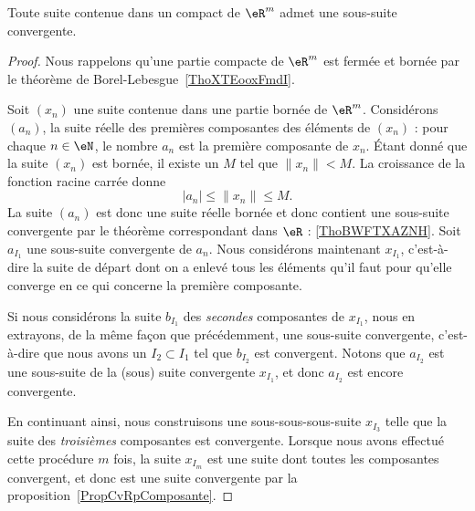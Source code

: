 \begin{theorem}        \label{ThoBolzanoWeierstrassRn}
	Toute suite contenue dans un compact de \( \eR^m\) admet une sous-suite convergente.
\end{theorem}

\begin{proof}
	Nous rappelons qu'une partie compacte de \( \eR^m\) est fermée et bornée par le théorème de Borel-Lebesgue~\ref{ThoXTEooxFmdI}.

	Soit \( (x_n)\) une suite contenue dans une partie bornée de \( \eR^m\). Considérons \( (a_n)\), la suite réelle des premières composantes des éléments de \( (x_n)\) : pour chaque \( n\in\eN\), le nombre \( a_n\) est la première composante de \( x_n\). Étant donné que la suite \( (x_n)\) est bornée, il existe un \( M\) tel que \( \| x_n \|<M\). La croissance de la fonction racine carrée donne
	\begin{equation}
		| a_n |\leq\| x_n \|\leq M.
	\end{equation}
	La suite \( (a_n)\) est donc une suite réelle bornée et donc contient une sous-suite convergente par le théorème correspondant dans \( \eR\) :  \ref{ThoBWFTXAZNH}. Soit \( a_{I_1}\) une sous-suite convergente de \( a_n\). Nous considérons maintenant \( x_{I_1}\), c'est-à-dire la suite de départ dont on a enlevé tous les éléments qu'il faut pour qu'elle converge en ce qui concerne la première composante.

	Si nous considérons la suite \( b_{I_1}\) des \emph{secondes} composantes de \( x_{I_1}\), nous en extrayons, de la même façon que précédemment, une sous-suite convergente, c'est-à-dire que nous avons un \( I_2\subset I_1\) tel que \( b_{I_2}\) est convergent. Notons que \( a_{I_2}\) est une sous-suite de la (sous) suite convergente \( x_{I_1}\), et donc \( a_{I_2}\) est encore convergente.

	En continuant ainsi, nous construisons une sous-sous-sous-suite \( x_{I_3}\) telle que la suite des \emph{troisièmes} composantes est convergente. Lorsque nous avons effectué cette procédure \( m\) fois, la suite \( x_{I_m}\) est une suite dont toutes les composantes convergent, et donc est une suite convergente par la proposition~\ref{PropCvRpComposante}.


\end{proof}
